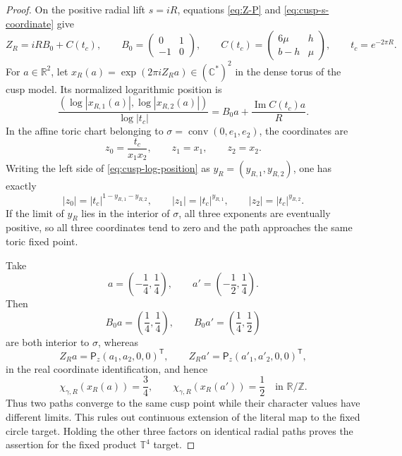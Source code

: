 \documentclass[11pt]{article}
\numberwithin{equation}{section}
\theoremstyle{definition}
\theoremstyle{remark}
\newcommand{\R}{\mathbb R}
\newcommand{\C}{\mathbb C}
\newcommand{\Z}{\mathbb Z}
\begin{document}
\begin{proof}
On the positive radial lift $s=iR$, equations \eqref{eq:Z-P} and
\eqref{eq:cusp-s-coordinate} give
\[
 Z_R=iR B_0+C(t_c),\qquad
 B_0=\begin{pmatrix}0&1\\-1&0\end{pmatrix},\qquad
 C(t_c)=\begin{pmatrix}6\mu&h\\b-h&\mu\end{pmatrix},
 \qquad t_c=e^{-2\pi R}.
\]
For $a\in\R^2$, let
$x_R(a)=\exp(2\pi iZ_Ra)\in(\C^*)^2$ in the dense torus of the cusp model.
Its normalized logarithmic position is
\begin{equation}\label{eq:cusp-log-position}
 \frac{(\log|x_{R,1}(a)|,\log|x_{R,2}(a)|)}{\log|t_c|}
 =B_0a+\frac{\operatorname{Im}C(t_c)a}{R}.
\end{equation}
In the affine toric chart belonging to
$\sigma=\operatorname{conv}(0,e_1,e_2)$, the coordinates are
\[
 z_0=\frac{t_c}{x_1x_2},\qquad z_1=x_1,\qquad z_2=x_2.
\]
Writing the left side of \eqref{eq:cusp-log-position} as
$y_R=(y_{R,1},y_{R,2})$, one has exactly
\[
 |z_0|=|t_c|^{1-y_{R,1}-y_{R,2}},\qquad
 |z_1|=|t_c|^{y_{R,1}},\qquad
 |z_2|=|t_c|^{y_{R,2}}.
\]
If the limit of $y_R$ lies in the interior of $\sigma$, all three exponents
are eventually positive, so all three coordinates tend to zero and the path
approaches the same toric fixed point.

Take
\[
 a=\left(-\frac14,\frac14\right),\qquad
 a'=\left(-\frac12,\frac14\right).
\]
Then
\[
 B_0a=\left(\frac14,\frac14\right),\qquad
 B_0a'=\left(\frac14,\frac12\right)
\]
are both interior to $\sigma$, whereas
\[
 Z_Ra=\mathsf P_z(a_1,a_2,0,0)^{\mathsf T},\qquad
 Z_Ra'=\mathsf P_z(a'_1,a'_2,0,0)^{\mathsf T},
\]
in the real coordinate identification, and hence
\[
 \chi_{\gamma,R}(x_R(a))=\frac34,
 \qquad
 \chi_{\gamma,R}(x_R(a'))=\frac12
 \quad\text{in }\R/\Z.
\]
Thus two paths converge to the same cusp point while their character values
have different limits.  This rules out continuous extension of the literal
map to the fixed circle target.  Holding the other three factors on identical
radial paths proves the assertion for the fixed product $\mathbb T^4$ target.
\end{proof}
\end{document}
